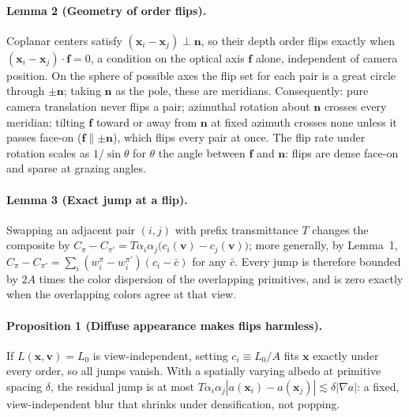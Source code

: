 \paragraph{Lemma 2 (Geometry of order flips).} Coplanar centers satisfy
$(\mathbf{x}_i-\mathbf{x}_j)\perp\mathbf{n}$, so their depth order flips exactly when
$(\mathbf{x}_i-\mathbf{x}_j)\cdot\mathbf{f}=0$, a condition on the optical axis $\mathbf{f}$ alone,
independent of camera position. On the sphere of possible axes the flip set for each pair is a
great circle through $\pm\mathbf{n}$; taking $\mathbf{n}$ as the pole, these are meridians.
Consequently: pure camera translation never flips a pair; azimuthal rotation about $\mathbf{n}$
crosses every meridian; tilting $\mathbf{f}$ toward or away from $\mathbf{n}$ at fixed azimuth
crosses none unless it passes face-on ($\mathbf{f}\parallel\pm\mathbf{n}$), which flips every pair
at once. The flip rate under rotation scales as $1/\sin\theta$ for $\theta$ the angle between
$\mathbf{f}$ and $\mathbf{n}$: flips are dense face-on and sparse at grazing angles.

\paragraph{Lemma 3 (Exact jump at a flip).} Swapping an adjacent pair $(i,j)$ with prefix
transmittance $T$ changes the composite by
$C_\pi - C_{\pi'} = T\alpha_i\alpha_j\big(c_i(\mathbf{v})-c_j(\mathbf{v})\big)$; more generally, by
Lemma~1, $C_\pi-C_{\pi'}=\sum_i(w_i^\pi-w_i^{\pi'})(c_i-\bar c)$ for any $\bar c$. Every jump is
therefore bounded by $2A$ times the color dispersion of the overlapping primitives, and is zero
exactly when the overlapping colors agree at that view.

\paragraph{Proposition 1 (Diffuse appearance makes flips harmless).} If
$L(\mathbf{x},\mathbf{v})=L_0$ is view-independent, setting $c_i\equiv L_0/A$ fits $\mathbf{x}$
exactly under every order, so all jumps vanish. With a spatially varying albedo at primitive
spacing $\delta$, the residual jump is at most $T\alpha_i\alpha_j|a(\mathbf{x}_i)-a(\mathbf{x}_j)|
\lesssim \delta|\nabla a|$: a fixed, view-independent blur that shrinks under densification, not
popping.


